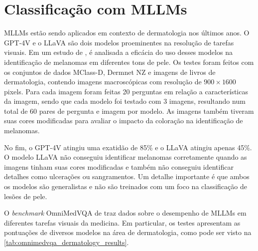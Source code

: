 \section{Classificação com MLLMs}

\acp{MLLM} estão sendo aplicados em contexto de dermatologia nos últimos anos. O \ac{GPT}-4V e o \ac{LLaVA} são dois modelos proeminentes na resolução de tarefas
visuais. Em um estudo de \textcite{cirone2024assessing}, é analisada a eficácia do uso desses modelos na identificação de melanomas em diferentes tons de pele. Os
testes foram feitos com os conjuntos de dados MClass-D, Dermnet NZ e imagens de livros de dermatologia, contendo imagens macroscópicas com resolução de
\begin{math}900 \times 1600\end{math} pixels. Para cada imagem foram feitas 20 perguntas em relação a características da imagem, sendo que cada modelo foi testado com 3
imagens, resultando num total de 60 pares de pergunta e imagem por modelo. As imagens também tiveram suas cores modificadas para avaliar o impacto da coloração na
identificação de melanomas.


No fim, o \ac{GPT}-4V atingiu uma exatidão de 85\% e o \ac{LLaVA} atingiu apenas 45\%. O modelo \ac{LLaVA} não conseguiu identificar melanomas corretamente quando as
imagens tinham suas cores modificadas e também não conseguiu identificar detalhes como ulcerações ou sangramentos. Um detalhe importante é que ambos os modelos são
generalistas e não são treinados com um foco na classificação de lesões de pele.

O \textit{benchmark} OmniMedVQA de \textcite{hu2024omnimedvqa} traz dados sobre o desempenho de \acp{MLLM} em diferentes tarefas visuais da medicina. Em particular, os
testes apresentam as pontuações de diversos modelos na área de dermatologia, como pode ser visto na \autoref{tab:omnimedvqa_dermatology_results}.

